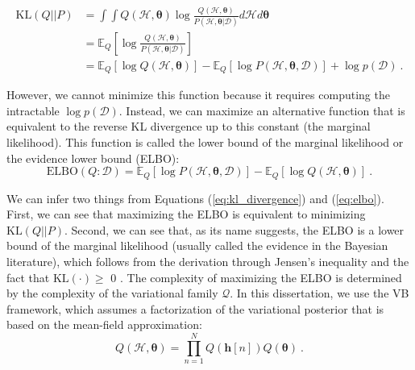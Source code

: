 \begin{align}\label{eq:kl_divergence}
\text{KL}(Q | | P) 
\nonumber &= \int \int Q(\mathcal{H}, \bm{\theta}) \log \frac{Q(\mathcal{H}, \bm{\theta})}{P(\mathcal{H}, \bm{\theta} | \mathcal{D})} d\mathcal{H} d\bm{\theta} \\
 &= \mathbb{E}_{Q} \left[\log \frac{Q(\mathcal{H}, \bm{\theta})}{P(\mathcal{H}, \bm{\theta} | \mathcal{D})} \right] \\
 \nonumber &= \mathbb{E}_{Q} \left[\log Q(\mathcal{H}, \bm{\theta}) \right] - \mathbb{E}_{Q} \left[\log P(\mathcal{H}, \bm{\theta}, \mathcal{D}) \right] + \log p(\mathcal{D}) \ .
\end{align}

However, we cannot minimize this function because it requires computing the intractable $\log p(\mathcal{D})$. Instead, we can maximize an alternative function that is equivalent to the reverse KL divergence up to this constant (the marginal likelihood). This function is called the lower bound of the marginal likelihood or the evidence lower bound (ELBO):
\begin{equation}\label{eq:elbo}
\text{ELBO}(Q : \mathcal{D}) = \mathbb{E}_{Q} \left[\log P(\mathcal{H}, \bm{\theta}, \mathcal{D}) \right] - \mathbb{E}_{Q} \left[\log Q(\mathcal{H}, \bm{\theta}) \right] \ .
\end{equation}

We can infer two things from Equations (\ref{eq:kl_divergence}) and (\ref{eq:elbo}). First, we can see that maximizing the ELBO is equivalent to minimizing $\text{KL}(Q | | P)$. Second, we can see that, as its name suggests, the ELBO is a lower bound of the marginal likelihood (usually called the evidence in the Bayesian literature), which follows from the derivation through Jensen's inequality and the fact that $\text{KL}(\cdot) \geq $ 0 \citep{jordan1999}. The complexity of maximizing the ELBO is determined by the complexity of the variational family $\mathcal{Q}$. In this dissertation, we use the VB framework, which assumes a factorization of the variational posterior that is based on the mean-field approximation:
\begin{equation*}
Q(\mathcal{H}, \bm{\theta}) = \prod_{n=1}^{N} Q(\mathbf{h}[n]) Q(\bm{\theta})\ .
\end{equation*}

